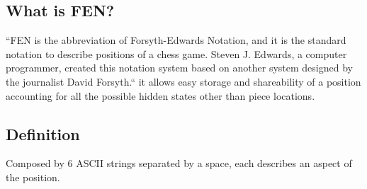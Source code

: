 
\subsection{What is FEN?} 
``FEN is the abbreviation of Forsyth-Edwards Notation, and it is the standard notation to describe positions of a chess game. Steven J. Edwards, a computer programmer, created this notation system based on another system designed by the journalist David Forsyth.`` 
\cite{chess:fen}
\newline
it allows easy storage and shareability of a position accounting for all the possible hidden states other than piece locations.

\subsection{Definition}
Composed by 6 ASCII strings separated by a space, each describes an aspect of the position.

